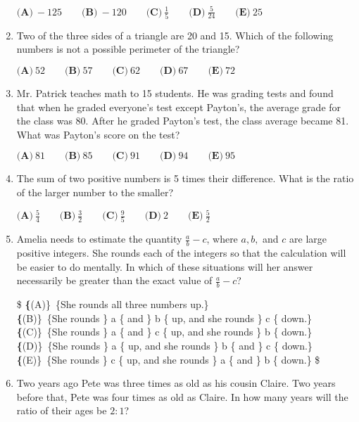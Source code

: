 \documentclass{article}
\begin{document}
\begin{enumerate}[label=\arabic*., itemsep=0.5em]
$ \textbf{(A)}\ -125\qquad\textbf{(B)}\ -120\qquad\textbf{(C)}\ \frac{1}{5}\qquad\textbf{(D)}\ \frac{5}{24}\qquad\textbf{(E)}\ 25 $\par \vspace{0.5em}\item Two of the three sides of a triangle are 20 and 15. Which of the following numbers is not a possible perimeter of the triangle?

$ \textbf{(A)}\ 52\qquad\textbf{(B)}\ 57\qquad\textbf{(C)}\ 62\qquad\textbf{(D)}\ 67\qquad\textbf{(E)}\ 72 $\par \vspace{0.5em}\item Mr. Patrick teaches math to 15 students. He was grading tests and found that when he graded everyone's test except Payton's, the average grade for the class was 80. After he graded Payton's test, the class average became 81. What was Payton's score on the test?

$ \textbf{(A)}\ 81\qquad\textbf{(B)}\ 85\qquad\textbf{(C)}\ 91\qquad\textbf{(D)}\ 94\qquad\textbf{(E)}\ 95 $\par \vspace{0.5em}\item The sum of two positive numbers is 5 times their difference. What is the ratio of the larger number to the smaller?

$ \textbf{(A)}\ \frac54 \qquad\textbf{(B)}\ \frac32 \qquad\textbf{(C)}\ \frac95 \qquad\textbf{(D)}\ 2 \qquad\textbf{(E)}\ \frac52 $\par \vspace{0.5em}\item Amelia needs to estimate the quantity $\frac{a}{b} - c$, where $a, b,$ and $c$ are large positive integers. She rounds each of the integers so that the calculation will be easier to do mentally. In which of these situations will her answer necessarily be greater than the exact value of $\frac{a}{b} - c$?

\$ \textbf\{(A)\}\ \text\{She rounds all three numbers up.\}\\
\qquad\textbf\{(B)\}\ \text\{She rounds \} a \text\{ and \} b \text\{ up, and she rounds \} c \text\{ down.\}\\
\qquad\textbf\{(C)\}\ \text\{She rounds \} a \text\{ and \} c \text\{ up, and she rounds \} b \text\{ down.\} \\
\qquad\textbf\{(D)\}\ \text\{She rounds \} a \text\{ up, and she rounds \} b \text\{ and \} c \text\{ down.\}\\
\qquad\textbf\{(E)\}\ \text\{She rounds \} c \text\{ up, and she rounds \} a \text\{ and \} b \text\{ down.\} \$\par \vspace{0.5em}\item Two years ago Pete was three times as old as his cousin Claire. Two years before that, Pete was four times as old as Claire. In how many years will the ratio of their ages be $2 : 1$?


\end{enumerate}
\end{document}
